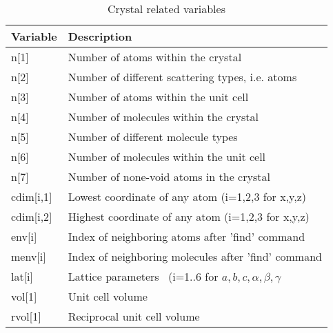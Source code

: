 \begin{table}[!tbh]
\centering
\begin{tabularx}{\textwidth}{|p{30mm}|X|}
  \hline
  {\bf Variable} & {\bf Description} \\
  \hline\hline
  n[1]      & Number of atoms within the crystal \\
  n[2]      & Number of different scattering types, i.e. atoms \\
  n[3]      & Number of atoms within the unit cell \\
  n[4]      & Number of molecules within the crystal \\
  n[5]      & Number of different molecule types \\
  n[6]      & Number of molecules within the unit cell \\
  n[7]      & Number of none-void atoms in the crystal \\
  \hline
  cdim[i,1] & Lowest coordinate of any atom (i=1,2,3 for x,y,z) \\
  cdim[i,2] & Highest coordinate of any atom (i=1,2,3 for x,y,z) \\
  \hline\hline
  env[i]    & Index of neighboring atoms after 'find' command \\
  menv[i]   & Index of neighboring molecules after 'find' command \\
  \hline\hline
  lat[i]    & Lattice parameters \
              (i=1..6 for $a,b,c,\alpha,\beta,\gamma$\\
  vol[1]    & Unit cell volume \\
  rvol[1]   & Reciprocal unit cell volume \\
  \hline
\end{tabularx}
\caption{\label{v1-tab}Crystal related variables}
\end{table}

